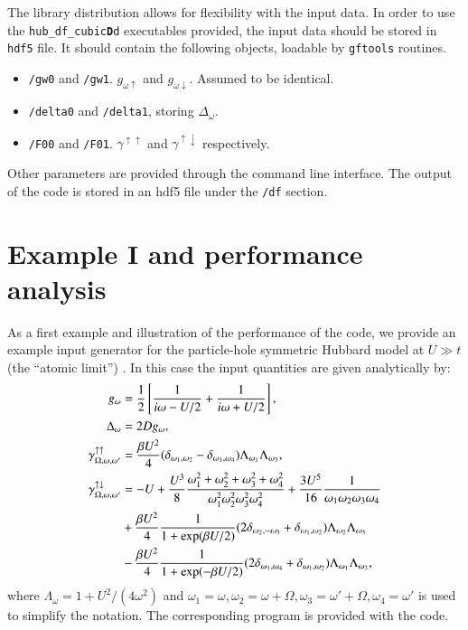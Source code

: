 \documentclass[3p,times,procedia]{elsarticle}
\begin{document}
The library distribution allows for flexibility with the input data. In order to use the \texttt{hub\_df\_cubic{\bf D}d} executables provided, the input data should be stored in \texttt{hdf5} file. It should contain the following objects, loadable by \texttt{gftools} routines. 
\begin{itemize}
\item \texttt{/gw0} and \texttt{/gw1}. $g_{\omega \uparrow}$ and $g_{\omega \downarrow}$.  Assumed to be identical.
\item \texttt{/delta0} and \texttt{/delta1}, storing $\Delta_\omega$.
\item \texttt{/F00} and \texttt{/F01}. $\gamma^{\uparrow\uparrow}$ and $\gamma^{\uparrow\downarrow}$ respectively.
\end{itemize}
Other parameters are provided through the command line interface.
The output of the code is stored in an hdf5 file under the \texttt{/df} section.

\section{Example I and performance analysis}\label{sec:perf}
As a first example and illustration of the performance of the code, we provide an example input generator for the particle-hole symmetric Hubbard model at $U \gg t$ (the  ``atomic limit'') . In this case the input quantities are given analytically by:
\begin{align}\label{eq:atomic_limit1}
g_{\omega} & = \frac{1}{2}\left[\frac{1}{i\omega - U/2} + \frac{1}{i\omega + U/2}\right], \\
\Delta_{\omega} & = 2Dg_{\omega}, \label{eq:atomic_limit2} \\ 
\gamma^{\uparrow\uparrow}_{\Omega,\omega,\omega'} & = \frac{\beta U^2}{4} (\delta_{\omega_1,\omega_2} - \delta_{\omega_1,\omega_4} ) \Lambda_{\omega_1}\Lambda_{\omega_3}, \label{eq:atomic_limit3} \\ 
\label{eq:atomic_limit4}
\gamma^{\uparrow\downarrow}_{\Omega,\omega,\omega'} & = -U + 
\frac{U^3}{8}\frac{\omega_1^2 + \omega_2^2 + \omega_3^2 + \omega_4^2}{\omega_1^2\omega_2^2\omega_3^2\omega_4^2} + \frac{3U^5}{16}\frac{1}{\omega_1\omega_2\omega_3\omega_4}  \\
& \notag + \frac{\beta U^2}{4} \frac{1}{1 + \exp(\beta U /2 )} 
(2\delta_{ \omega_2, -\omega_3} + \delta_{\omega_1, \omega_2}) 
\Lambda_{\omega_2} \Lambda_{\omega_3}  \\ 
& \notag - \frac{\beta U^2}{4} \frac{1}{1 + \exp(-\beta U /2 )} 
(2\delta_{ \omega_1, \omega_4} + \delta_{\omega_1, \omega_2}) 
\Lambda_{\omega_1} \Lambda_{\omega_3},
\end{align}
where $\Lambda_\omega = 1 + U^2/(4\omega^2)$ and  $\omega_1 = \omega, \omega_2 = \omega + \Omega, \omega_3 = \omega' + \Omega, \omega_4 = \omega'$ is used to simplify the notation. The corresponding program is provided with the code. 
\end{document}
